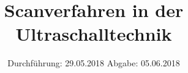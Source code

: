 

\subject{US-2}
\title{Scanverfahren in der Ultraschalltechnik}
\date{%
  Durchführung: 29.05.2018
  \hspace{3em}
  Abgabe: 05.06.2018
}



\maketitle
\thispagestyle{empty}
\tableofcontents
\newpage






\printbibliography{}


